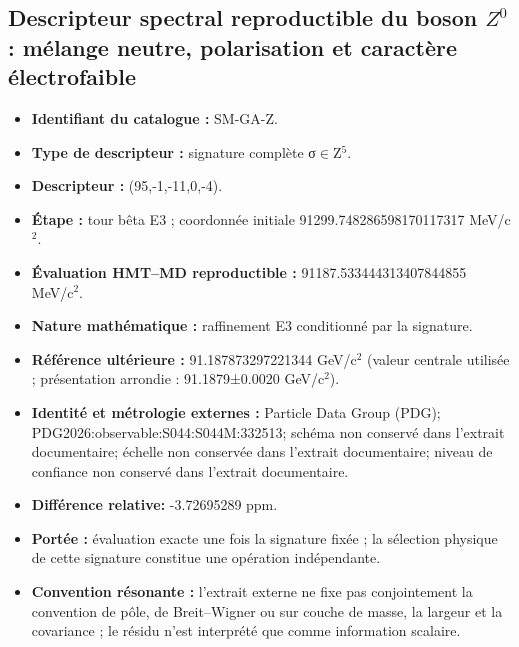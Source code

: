 \subsection{Descripteur spectral reproductible du boson \(Z^0\) : mélange neutre, polarisation et caractère électrofaible}
\begin{itemize}
\item \textbf{Identifiant du catalogue :} SM-GA-Z.
\item \textbf{Type de descripteur :} signature complète σ\(\in\)Z\({}^{5}\).
\item \textbf{Descripteur :} (95,-1,-11,0,-4).
\item \textbf{Étape :} tour bêta E3 ; coordonnée initiale 91299.748286\allowbreak{}598170\allowbreak{}117317 MeV/c\({}^{2}\).
\item \textbf{Évaluation HMT--MD reproductible :} 91187.533444\allowbreak{}313407\allowbreak{}844855 MeV/c\({}^{2}\).
\item \textbf{Nature mathématique :} raffinement E3 conditionné par la signature.
\item \textbf{Référence ultérieure :} 91.187873\allowbreak{}297221\allowbreak{}344 GeV/c\({}^{2}\) (valeur centrale utilisée ; présentation arrondie : 91.1879±\allowbreak{}0.0020 GeV/c\({}^{2}\)).
\item \textbf{Identité et métrologie externes :} Particle Data Group (PDG); PDG2026:\allowbreak{}observable:\allowbreak{}S044:\allowbreak{}S044M:\allowbreak{}332513; schéma non conservé dans l’extrait documentaire; échelle non conservée dans l’extrait documentaire; niveau de confiance non conservé dans l’extrait documentaire.
\item \textbf{Différence relative:} -3.726952\allowbreak{}89 ppm.
\item \textbf{Portée :} évaluation exacte une fois la signature fixée ; la sélection physique de cette signature constitue une opération indépendante.
\item \textbf{Convention résonante :} l’extrait externe ne fixe pas conjointement la convention de pôle, de Breit--Wigner ou sur couche de masse, la largeur et la covariance ; le résidu n’est interprété que comme information scalaire.
\end{itemize}
